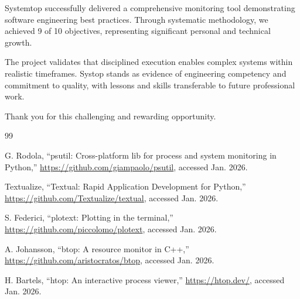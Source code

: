 \documentclass[12pt,a4paper,oneside]{report}
\begin{document}
Systemtop successfully delivered a comprehensive monitoring tool demonstrating software engineering best practices. Through systematic methodology, we achieved 9 of 10 objectives, representing significant personal and technical growth.

The project validates that disciplined execution enables complex systems within realistic timeframes. Systop stands as evidence of engineering competency and commitment to quality, with lessons and skills transferable to future professional work.

Thank you for this challenging and rewarding opportunity.




{}
\begin{thebibliography}{99}

G. Rodola, ``psutil: Cross-platform lib for process and system monitoring in Python,'' \url{https://github.com/giampaolo/psutil}, accessed Jan. 2026.

Textualize, ``Textual: Rapid Application Development for Python,'' \url{https://github.com/Textualize/textual}, accessed Jan. 2026.

S. Federici, ``plotext: Plotting in the terminal,'' \url{https://github.com/piccolomo/plotext}, accessed Jan. 2026.

A. Johansson, ``btop: A resource monitor in C++,'' \url{https://github.com/aristocratos/btop}, accessed Jan. 2026.

H. Bartels, ``htop: An interactive process viewer,'' \url{https://htop.dev/}, accessed Jan. 2026.

\end{thebibliography}
\end{document}

